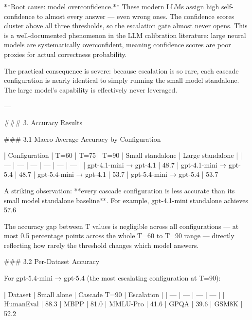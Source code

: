 **Root cause: model overconfidence.** These modern LLMs assign high self-confidence to almost every answer — even wrong ones. The confidence scores cluster above all three thresholds, so the escalation gate almost never opens. This is a well-documented phenomenon in the LLM calibration literature: large neural models are systematically overconfident, meaning confidence scores are poor proxies for actual correctness probability.

The practical consequence is severe: because escalation is so rare, each cascade configuration is nearly identical to simply running the small model standalone. The large model's capability is effectively never leveraged.

---

### 3. Accuracy Results

### 3.1 Macro-Average Accuracy by Configuration

| Configuration | T=60 | T=75 | T=90 | Small standalone | Large standalone |
| --- | --- | --- | --- | --- | --- |
| gpt-4.1-mini → gpt-4.1 | 48.7%
| gpt-4.1-mini → gpt-5.4 | 48.7%
| gpt-5.4-mini → gpt-4.1 | 53.7%
| gpt-5.4-mini → gpt-5.4 | 53.7%

A striking observation: **every cascade configuration is less accurate than its small model standalone baseline**. For example, gpt-4.1-mini standalone achieves 57.6%

The accuracy gap between T values is negligible across all configurations — at most 0.5 percentage points across the whole T=60 to T=90 range — directly reflecting how rarely the threshold changes which model answers.

### 3.2 Per-Dataset Accuracy

For gpt-5.4-mini → gpt-5.4 (the most escalating configuration at T=90):

| Dataset | Small alone | Cascade T=90 | Escalation |
| --- | --- | --- | --- |
| HumanEval | 88.3%
| MBPP | 81.0%
| MMLU-Pro | 41.6%
| GPQA | 39.6%
| GSM8K | 52.2%

